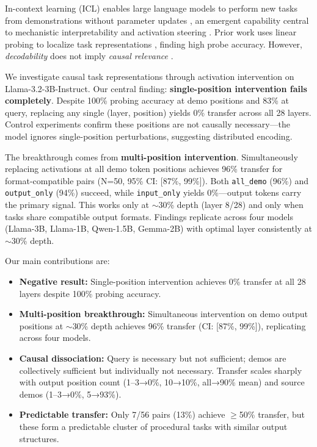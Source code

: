 \documentclass{article}
\begin{document}
In-context learning (ICL) enables large language models to perform new tasks from demonstrations without parameter updates \citep{brown2020language,garg2022can}, an emergent capability \citep{wei2022emergent} central to mechanistic interpretability and activation steering \citep{turner2023activation}. Prior work uses linear probing to localize task representations \citep{todd2023function,hendel2023context}, finding high probe accuracy. However, \emph{decodability} does not imply \emph{causal relevance} \citep{ravfogel2020null,elazar2021amnesic}.

We investigate causal task representations through activation intervention on Llama-3.2-3B-Instruct. Our central finding: \textbf{single-position intervention fails completely}. Despite 100\% probing accuracy at demo positions and 83\% at query, replacing any single (layer, position) yields 0\% transfer across all 28 layers. Control experiments confirm these positions are not causally necessary---the model ignores single-position perturbations, suggesting distributed encoding.

The breakthrough comes from \textbf{multi-position intervention}. Simultaneously replacing activations at all demo token positions achieves 96\% transfer for format-compatible pairs (N=50, 95\% CI: [87\%, 99\%]). Both \texttt{all\_demo} (96\%) and \texttt{output\_only} (94\%) succeed, while \texttt{input\_only} yields 0\%---output tokens carry the primary signal. This works only at $\sim$30\% depth (layer 8/28) and only when tasks share compatible output formats. Findings replicate across four models (Llama-3B, Llama-1B, Qwen-1.5B, Gemma-2B) with optimal layer consistently at $\sim$30\% depth.

Our main contributions are:
\begin{itemize}
    \item \textbf{Negative result:} Single-position intervention achieves 0\% transfer at all 28 layers despite 100\% probing accuracy.
    \item \textbf{Multi-position breakthrough:} Simultaneous intervention on demo output positions at $\sim$30\% depth achieves 96\% transfer (CI: [87\%, 99\%]), replicating across four models.
    \item \textbf{Causal dissociation:} Query is necessary but not sufficient; demos are collectively sufficient but individually not necessary. Transfer scales sharply with output position count (1--3→0\%, 10→10\%, all→90\% mean) and source demos (1--3→0\%, 5→93\%).
    \item \textbf{Predictable transfer:} Only 7/56 pairs (13\%) achieve $\geq$50\% transfer, but these form a predictable cluster of procedural tasks with similar output structures.
\end{itemize}
\end{document}
